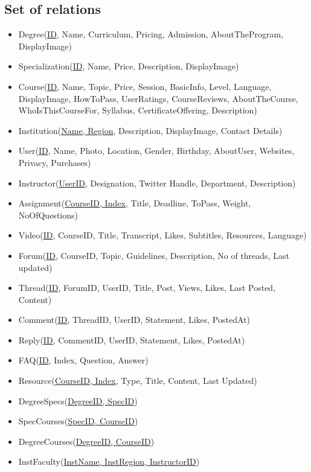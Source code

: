 \documentclass[10pt]{article}
\begin{document}
\subsection{Set of relations}
\begin{itemize}
\item Degree(\underline{ID}, Name, Curriculum, Pricing, Admission, AboutTheProgram, DisplayImage)
\item Specialization(\underline{ID}, Name, Price, Description, DisplayImage)
\item Course(\underline{ID}, Name, Topic, Price, Session, BasicInfo, Level, Language, DisplayImage, HowToPass, UserRatings, CourseReviews, AboutTheCourse, WhoIsThisCourseFor, Syllabus, CertificateOffering, Description)
\item Institution(\underline{Name, Region}, Description, DisplayImage, Contact Details)
\item User(\underline{ID}, Name, Photo, Location, Gender, Birthday, AboutUser, Websites, Privacy, Purchases)
\item Instructor(\underline{UserID}, Designation, Twitter Handle, Department, Description)
\item Assignment(\underline{CourseID, Index}, Title, Deadline, ToPass, Weight, NoOfQuestions)
\item Video(\underline{ID}, CourseID, Title, Transcript, Likes, Subtitles, Resources, Language)
\item Forum(\underline{ID}, CourseID, Topic, Guidelines, Description, No of threads, Last updated)
\item Thread(\underline{ID}, ForumID, UserID, Title, Post, Views, Likes, Last Posted, Content)
\item Comment(\underline{ID}, ThreadID, UserID, Statement, Likes, PostedAt)
\item Reply(\underline{ID}, CommentID, UserID, Statement, Likes, PostedAt)
\item FAQ(\underline{ID}, Index, Question, Answer)
\item Resource(\underline{CourseID, Index}, Type, Title, Content, Last Updated)
\item DegreeSpecs(\underline{DegreeID, SpecID})
\item SpecCourses(\underline{SpecID, CourseID})
\item DegreeCourses(\underline{DegreeID, CourseID})
\item InstFaculty(\underline{InstName, InstRegion, InstructorID})

\end{itemize}
\end{document}
